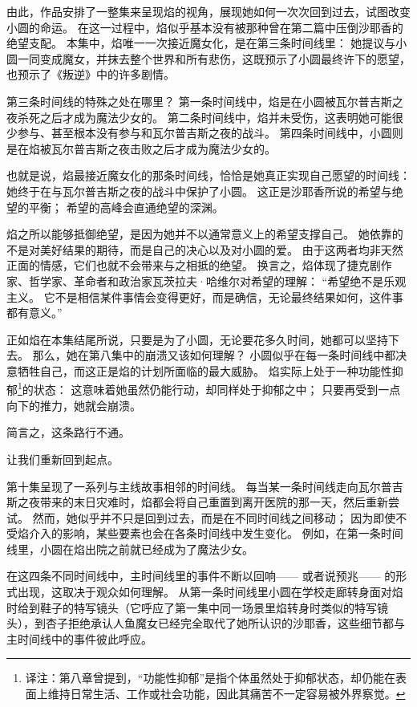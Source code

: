 由此，作品安排了一整集来呈现焰的视角，展现她如何一次次回到过去，试图改变小圆的命运。
在这一过程中，焰似乎基本没有被那种曾在第二篇中压倒沙耶香的绝望支配。
本集中，焰唯一一次接近魔女化，是在第三条时间线里：
她提议与小圆一同变成魔女，并抹去整个世界和所有悲伤，这既预示了小圆最终许下的愿望，也预示了《叛逆》中的许多剧情。

第三条时间线的特殊之处在哪里？
第一条时间线中，焰是在小圆被瓦尔普吉斯之夜杀死之后才成为魔法少女的。
第二条时间线中，焰并未受伤，这表明她可能很少参与、甚至根本没有参与和瓦尔普吉斯之夜的战斗。
第四条时间线中，小圆则是在焰被瓦尔普吉斯之夜击败之后才成为魔法少女的。

也就是说，焰最接近魔女化的那条时间线，恰恰是她真正实现自己愿望的时间线：
她终于在与瓦尔普吉斯之夜的战斗中保护了小圆。
这正是沙耶香所说的希望与绝望的平衡；
希望的高峰会直通绝望的深渊。

焰之所以能够抵御绝望，是因为她并不以通常意义上的希望支撑自己。
她依靠的不是对美好结果的期待，而是自己的决心以及对小圆的爱。
由于这两者均非天然正面的情感，它们也就不会带来与之相抵的绝望。
换言之，焰体现了捷克剧作家、哲学家、革命者和政治家瓦茨拉夫·哈维尔对希望的理解：
“希望绝不是乐观主义。
它不是相信某件事情会变得更好，而是确信，无论最终结果如何，这件事都有意义。”
\cite{havel1990politics-hope}

正如焰在本集结尾所说，只要是为了小圆，无论要花多久时间，她都可以坚持下去。
那么，她在第八集中的崩溃又该如何理解？
小圆似乎在每一条时间线中都决意牺牲自己，而这正是焰的计划所面临的最大威胁。
焰实际上处于一种功能性抑郁\footnote{%
    译注：第八章曾提到，“功能性抑郁”是指个体虽然处于抑郁状态，却仍能在表面上维持日常生活、工作或社会功能，因此其痛苦不一定容易被外界察觉。
}的状态：
这意味着她虽然仍能行动，却同样处于抑郁之中；
只要再受到一点向下的推力，她就会崩溃。

简言之，这条路行不通。

让我们重新回到起点。

第十集呈现了一系列与主线故事相邻的时间线。
每当某一条时间线走向瓦尔普吉斯之夜带来的末日灾难时，焰都会将自己重置到离开医院的那一天，然后重新尝试。
然而，她似乎并不只是回到过去，而是在不同时间线之间移动；
因为即使不受焰介入的影响，某些要素也会在各条时间线中发生变化。
例如，在第一条时间线里，小圆在焰出院之前就已经成为了魔法少女。

在这四条不同时间线中，主时间线里的事件不断以回响——
或者说预兆——
的形式出现，这取决于观众如何理解。
从第一条时间线里小圆在学校走廊转身面对焰时给到鞋子的特写镜头（它呼应了第一集中同一场景里焰转身时类似的特写镜头），到杏子拒绝承认人鱼魔女已经完全取代了她所认识的沙耶香，这些细节都与主时间线中的事件彼此呼应。%

